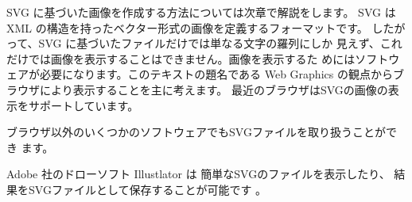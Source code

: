 SVG に基づいた画像を作成する方法については次章で解説をします。
%
SVG は XML の構造を持ったベクター形式の画像を定義するフォーマットです。
したがって、SVG に基づいたファイルだけでは単なる文字の羅列にしか
見えず、これだけでは画像を表示することはできません。画像を表示するた
めにはソフトウェアが必要になります。このテキストの題名である Web
Graphics の観点からブラウザにより表示することを主に考えます。
最近のブラウザはSVGの画像の表示をサポートしています。
\iffalse
が、
SVGの機能の一つであるアニメーション(第\ref{ChapAnimation}章で説明します)
のうち色のアニメーションについてはサポートしていません。
色のアニメーションはCSSで実現できるので2017年度からはこの方法で説明をし
ます。
\fi

ブラウザ以外のいくつかのソフトウェアでもSVGファイルを取り扱うことができ
ます。

Adobe 社のドローソフト Illustlator は 簡単なSVGのファイルを表示したり、
結果をSVGファイルとして保存することが可能です
。

